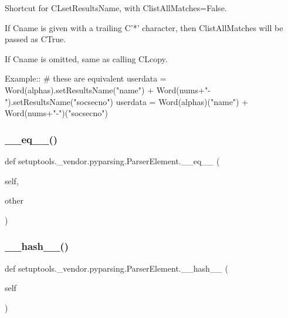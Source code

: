 \begin{DoxyVerb}Shortcut for C{L{setResultsName}}, with C{listAllMatches=False}.

If C{name} is given with a trailing C{'*'} character, then C{listAllMatches} will be
passed as C{True}.
   
If C{name} is omitted, same as calling C{L{copy}}.

Example::
    # these are equivalent
    userdata = Word(alphas).setResultsName("name") + Word(nums+"-").setResultsName("socsecno")
    userdata = Word(alphas)("name") + Word(nums+"-")("socsecno")             
\end{DoxyVerb}
 \mbox{\label{classsetuptools_1_1__vendor_1_1pyparsing_1_1ParserElement_a5043f8497ee649455795186744db5300}} 
\subsubsection{\texorpdfstring{\+\_\+\+\_\+eq\+\_\+\+\_\+()}{\_\_eq\_\_()}}
{\footnotesize\ttfamily def setuptools.\+\_\+vendor.\+pyparsing.\+Parser\+Element.\+\_\+\+\_\+eq\+\_\+\+\_\+ (\begin{DoxyParamCaption}\item[{}]{self,  }\item[{}]{other }\end{DoxyParamCaption})}

\mbox{\label{classsetuptools_1_1__vendor_1_1pyparsing_1_1ParserElement_ac2c4dc9a984b1cf325b5325fbdb85e48}} 
\subsubsection{\texorpdfstring{\+\_\+\+\_\+hash\+\_\+\+\_\+()}{\_\_hash\_\_()}}
{\footnotesize\ttfamily def setuptools.\+\_\+vendor.\+pyparsing.\+Parser\+Element.\+\_\+\+\_\+hash\+\_\+\+\_\+ (\begin{DoxyParamCaption}\item[{}]{self }\end{DoxyParamCaption})}

